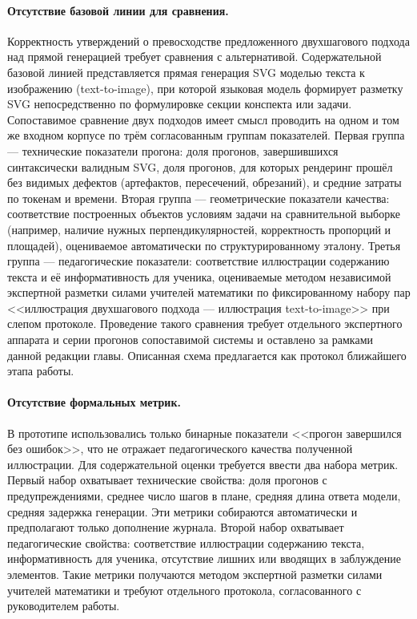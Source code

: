 \paragraph{Отсутствие базовой линии для сравнения.} Корректность утверждений о превосходстве предложенного двухшагового подхода над прямой генерацией требует сравнения с альтернативой. Содержательной базовой линией представляется прямая генерация SVG моделью текста к изображению (text-to-image), при которой языковая модель формирует разметку SVG непосредственно по формулировке секции конспекта или задачи. Сопоставимое сравнение двух подходов имеет смысл проводить на одном и том же входном корпусе по трём согласованным группам показателей. Первая группа --- технические показатели прогона: доля прогонов, завершившихся синтаксически валидным SVG, доля прогонов, для которых рендеринг прошёл без видимых дефектов (артефактов, пересечений, обрезаний), и средние затраты по токенам и времени. Вторая группа --- геометрические показатели качества: соответствие построенных объектов условиям задачи на сравнительной выборке (например, наличие нужных перпендикулярностей, корректность пропорций и площадей), оцениваемое автоматически по структурированному эталону. Третья группа --- педагогические показатели: соответствие иллюстрации содержанию текста и её информативность для ученика, оцениваемые методом независимой экспертной разметки силами учителей математики по фиксированному набору пар <<иллюстрация двухшагового подхода --- иллюстрация text\nobreakdash-to\nobreakdash-image>> при слепом протоколе. Проведение такого сравнения требует отдельного экспертного аппарата и серии прогонов сопоставимой системы и оставлено за рамками данной редакции главы. Описанная схема предлагается как протокол ближайшего этапа работы.

\paragraph{Отсутствие формальных метрик.} В прототипе использовались только бинарные показатели <<прогон завершился без ошибок>>, что не отражает педагогического качества полученной иллюстрации. Для содержательной оценки требуется ввести два набора метрик. Первый набор охватывает технические свойства: доля прогонов с предупреждениями, среднее число шагов в плане, средняя длина ответа модели, средняя задержка генерации. Эти метрики собираются автоматически и предполагают только дополнение журнала. Второй набор охватывает педагогические свойства: соответствие иллюстрации содержанию текста, информативность для ученика, отсутствие лишних или вводящих в заблуждение элементов. Такие метрики получаются методом экспертной разметки силами учителей математики и требуют отдельного протокола, согласованного с руководителем работы.

